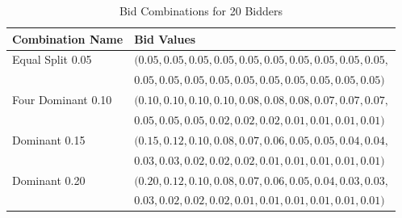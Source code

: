 \documentclass[format=acmsmall, review=false]{acmart}
\begin{document}
\begin{table}[H]
\centering
\captionsetup{skip=2pt}
\caption{Bid Combinations for 20 Bidders}
\begin{tabular}{ll}
\hline
\textbf{Combination Name} & \textbf{Bid Values} \\
\hline
Equal Split 0.05 & $(0.05, 0.05, 0.05, 0.05, 0.05, 0.05, 0.05, 0.05, 0.05, 0.05,$ \\
 & $0.05, 0.05, 0.05, 0.05, 0.05, 0.05, 0.05, 0.05, 0.05, 0.05)$ \\
Four Dominant 0.10 & $(0.10, 0.10, 0.10, 0.10, 0.08, 0.08, 0.08, 0.07, 0.07, 0.07,$ \\
 & $0.05, 0.05, 0.05, 0.02, 0.02, 0.02, 0.01, 0.01, 0.01, 0.01)$ \\
Dominant 0.15 & $(0.15, 0.12, 0.10, 0.08, 0.07, 0.06, 0.05, 0.05, 0.04, 0.04,$ \\
 & $0.03, 0.03, 0.02, 0.02, 0.02, 0.01, 0.01, 0.01, 0.01, 0.01)$ \\
Dominant 0.20 & $(0.20, 0.12, 0.10, 0.08, 0.07, 0.06, 0.05, 0.04, 0.03, 0.03,$ \\
 & $0.03, 0.02, 0.02, 0.02, 0.01, 0.01, 0.01, 0.01, 0.01, 0.01)$ \\
\hline
\end{tabular}
\label{tab:bids_20}
\end{table}
\end{document}
